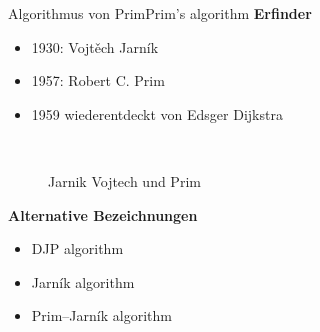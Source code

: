 \begin{frame}{Algorithmus von Prim}{Prim's algorithm}
	\textbf{Erfinder}
	\begin{itemize}
		\item 1930: Vojtěch Jarník
		\item 1957: Robert C. Prim
		\item 1959 wiederentdeckt von Edsger Dijkstra
	\end{itemize}
	
	\begin{figure}
\centering
\mbox{\quad
{}}
\caption{Jarnik Vojtech und Prim}
\end{figure}
	\textbf{Alternative Bezeichnungen}
	\begin{itemize}
		\item DJP algorithm
		\item Jarník algorithm
		\item Prim–Jarník algorithm
	\end{itemize}
	
\end{frame}